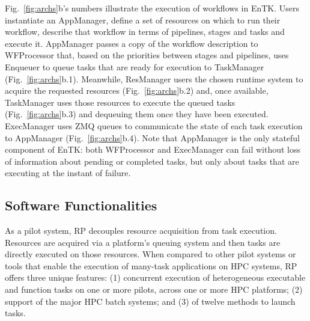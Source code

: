 \documentclass[preprint,12pt, a4paper]{elsarticle}
\begin{document}
Fig.~\ref{fig:archs}b's numbers illustrate the execution of workflows in
EnTK\@. Users instantiate an AppManager, %
define a set of resources on which to run their workflow,
describe that workflow in terms of pipelines, stages and tasks
and execute it.
AppManager passes a copy of the workflow description to WFProcessor that, based
on the priorities between stages and pipelines, uses Enqueuer to queue tasks
that are ready for execution to TaskManager (Fig.~\ref{fig:archs}b.1).
Meanwhile, ResManager users the chosen runtime system to acquire the requested
resources (Fig.~\ref{fig:archs}b.2) and, once available, TaskManager uses those
resources to execute the queued tasks (Fig.~\ref{fig:archs}b.3) and dequeuing
them once they have been executed. ExecManager uses ZMQ queues to communicate
the state of each task execution to AppManager (Fig.~\ref{fig:archs}b.4). Note
that AppManager is the only stateful component of EnTK\@: both WFProcessor and
ExecManager can fail without loss of information about pending or completed
tasks, but only about tasks that are executing at the instant of failure.

\subsection{Software Functionalities}\label{ssec:functionalities}


As a pilot system, RP decouples resource acquisition from task execution.
Resources are acquired via a platform's queuing system and then tasks are
directly executed on those resources.
%
%
When compared to other pilot systems or tools that enable the execution of
many-task applications on HPC systems, RP offers three unique features: (1)
concurrent execution of heterogeneous executable and function tasks on one or
more pilots, across one or more HPC platforms;
(2) support of the major HPC batch systems; and (3) of twelve methods to launch
tasks.
\end{document}
